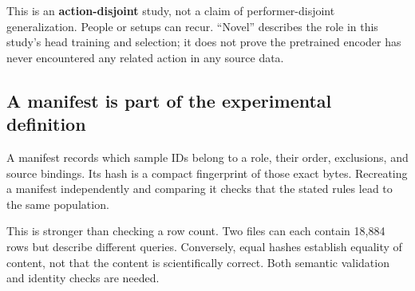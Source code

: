 This is an \textbf{action-disjoint} study, not a claim of performer-disjoint
generalization. People or setups can recur. ``Novel'' describes the role in
this study's head training and selection; it does not prove the pretrained
encoder has never encountered any related action in any source data.

\subsection{A manifest is part of the experimental definition}
A manifest records which sample IDs belong to a role, their order, exclusions,
and source bindings. Its hash is a compact fingerprint of those exact bytes.
Recreating a manifest independently and comparing it checks that the stated
rules lead to the same population.

This is stronger than checking a row count. Two files can each contain 18,884
rows but describe different queries. Conversely, equal hashes establish equality
of content, not that the content is scientifically correct. Both semantic
validation and identity checks are needed.

